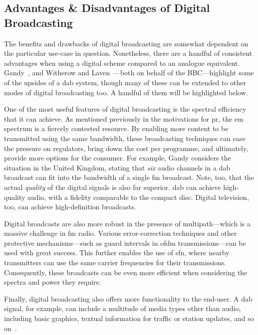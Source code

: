 \documentclass[class=report,11pt,crop=false]{standalone}
\begin{document}
\subsection{Advantages \& Disadvantages of Digital Broadcasting}
The benefits and drawbacks of digital broadcasting are somewhat dependent on the particular use-case in question. Nonetheless, there are a handful of consistent advantages when using a digital scheme compared to an analogue equivalent. Gandy~\cite{gandy2003dab}, and Witherow and Laven~\cite{Witherow1995}---both on behalf of the BBC---highlight some of the upsides of a \gls{dab} system, though many of these can be extended to other modes of digital broadcasting too. A handful of them will be highlighted below.

One of the most useful features of digital broadcasting is the spectral efficiency that it can achieve. As mentioned previously in the motivations for \gls{pr}, the \gls{em} spectrum is a fiercely contested resource. By enabling more content to be transmitted using the same bandwidth, these broadcasting techniques can ease the pressure on regulators, bring down the cost per programme, and ultimately, provide more options for the consumer. For example, Gandy considers the situation in the United Kingdom, stating that \emph{six} audio channels in a \gls{dab} broadcast can fit into the bandwidth of a single \gls{fm} broadcast. Note, too, that the actual \emph{quality} of the digital signals is also far superior. \gls{dab} can achieve high-quality audio, with a fidelity comparable to the compact disc. Digital television, too, can achieve high-definition broadcasts.

Digital broadcasts are also more robust in the presence of multipath---which is a massive challenge in \gls{fm} radio. Various error-correction techniques and other protective mechanisms---such as guard intervals in \gls{ofdm} transmissions---can be used with great success. This further enables the use of \gls{sfn}, where nearby transmitters can use the same carrier frequencies for their transmissions. Consequently, these broadcasts can be even more efficient when considering the spectra and power they require.

Finally, digital broadcasting also offers more functionality to the end-user. A \gls{dab} signal, for example, can include a multitude of media types other than audio, including basic graphics, textual information for traffic or station updates, and so on~\cite{dabstandard}.
\end{document}
